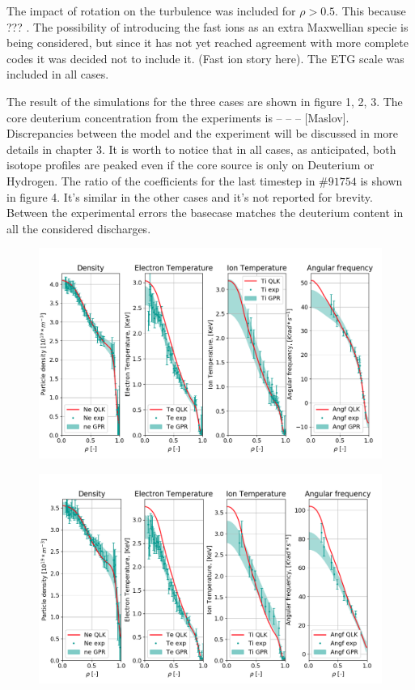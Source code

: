 \documentclass[a4paper,10pt]{iopart}
\begin{document}
The impact of rotation on the turbulence was included for $ \rho > 0.5 $. This because ??? . The possibility of introducing the fast ions as an extra Maxwellian specie is being considered, but since it has not yet reached agreement with more complete codes it was decided not to include it.
(Fast ion story here). The ETG scale was included in all cases.

The result of the simulations for the three cases are shown in figure 1, 2, 3. The core deuterium concentration from the experiments is -- -- -- [Maslov]. Discrepancies between the model and the experiment will be discussed in more details in chapter 3. It is worth to notice that in all cases, as anticipated, both isotope profiles are peaked even if the core source is only on Deuterium or Hydrogen. The ratio of the coefficients for the last timestep in $\#91754$ is shown in figure 4. It’s similar in the other cases and it’s not reported for brevity. Between the experimental errors the basecase matches the deuterium content in all the considered discharges.

\begin{figure}
	\centering
	\includegraphics[width=0.9\linewidth]{Plots/91754}
	\caption{}
	\label{fig:91754}
\end{figure}

\begin{figure}
	\centering
	\includegraphics[width=0.9\linewidth]{Plots/91232}
	\caption{}
	\label{fig:91232}
\end{figure}
\end{document}
